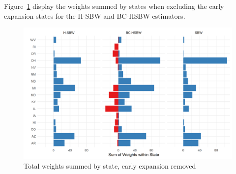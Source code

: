 \begin{landscape}
Figure~\ref{fig:weightsbystatec2} display the weights summed by states when excluding the early expansion states for the H-SBW and BC-HSBW estimators.

\begin{figure}[H]
\begin{center}
    \caption{Total weights summed by state, early expansion removed}
    \label{fig:weightsbystatec2}
    \includegraphics[scale=0.5]{01_Plots/weights-by-state-sbw-hsbw-c2-color.png}
\end{center}
\end{figure}
\end{landscape}
\clearpage